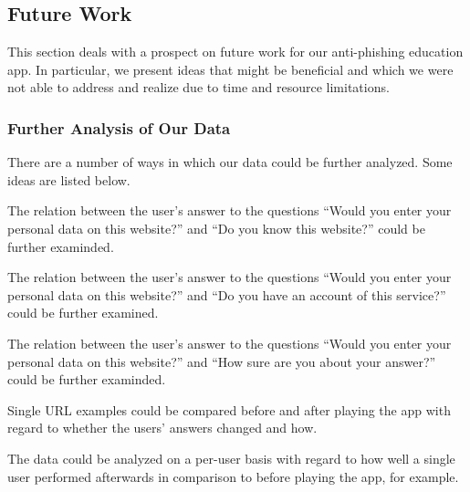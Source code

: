 \subsection{Future Work}
\label{s:future_work}
This section deals with a prospect on future work for our anti-phishing education app.
 In particular, we present ideas that might be beneficial and which we were not able to address and realize due to time and resource limitations.

\subsubsection{Further Analysis of Our Data}
There are a number of ways in which our data could be further analyzed. Some ideas are listed below.
\begin{description}[leftmargin=0cm]
	\item The relation between the user's answer to the questions ``Would you enter your personal data on this website?'' and ``Do you know this website?'' could be further examinded.
	\item The relation between the user's answer to the questions ``Would you enter your personal data on this website?'' and ``Do you have an account of this service?''  could be further examined.
	\item The relation between the user's answer to the questions ``Would you enter your personal data on this website?'' and ``How sure are you about your answer?'' could be further examinded.
	\item Single URL examples could be compared before and after playing the app with regard to whether the users' answers changed and how.
	\item The data could be analyzed on a per-user basis with regard to how well a single user performed afterwards in comparison to before playing the app, for example.
\end{description}

